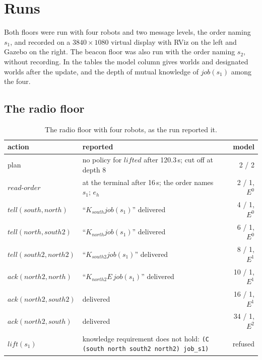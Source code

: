 \documentclass[11pt,a4paper]{article}
\theoremstyle{definition}
\newcommand{\Kop}[1]{K_{#1}}
\newcommand{\code}[1]{\texttt{\small #1}}
\newcommand{\ag}[1]{\mathit{#1}}
\newcommand{\job}{\mathit{job}}
\begin{document}
\section{Runs}
\label{sec:runs}

Both floors were run with four robots and two message levels, the order naming
$s_1$, and recorded on a $3840 \times 1080$ virtual display with RViz on the
left and Gazebo on the right. The beacon floor was also run with the order
naming $s_2$, without recording. In the tables the model column gives worlds
and designated worlds after the update, and the depth of mutual knowledge of
$\job(s_1)$ among the four.

\subsection{The radio floor}

\begin{table}[H]
\centering\small
\caption{The radio floor with four robots, as the run reported it.}
\label{tab:radio-run}
\begin{tabularx}{\textwidth}{@{}l X r@{}}
\toprule
action & reported & model \\
\midrule
plan & no policy for $\mathit{lifted}$ after 120.3\,s; cut off at depth 8 & 2 / 2 \\
$\mathit{read\text{-}order}$ & at the terminal after 16\,s; the order names $s_1$; $e_h$ & 2 / 1, $E^0$ \\
$\mathit{tell}(\ag{south}, \ag{north})$ & ``$\Kop{south}\job(s_1)$'' delivered & 4 / 1, $E^0$ \\
$\mathit{tell}(\ag{north}, \ag{south2})$ & ``$\Kop{north}\job(s_1)$'' delivered & 6 / 1, $E^0$ \\
$\mathit{tell}(\ag{south2}, \ag{north2})$ & ``$\Kop{south2}\job(s_1)$'' delivered & 8 / 1, $E^1$ \\
$\mathit{ack}(\ag{north2}, \ag{north})$ & ``$\Kop{north2}E\,\job(s_1)$'' delivered & 10 / 1, $E^1$ \\
$\mathit{ack}(\ag{north2}, \ag{south2})$ & delivered & 16 / 1, $E^1$ \\
$\mathit{ack}(\ag{north2}, \ag{south})$ & delivered & 34 / 1, $E^2$ \\
$\mathit{lift}(s_1)$ & knowledge requirement does not hold: \code{(C (south north south2 north2) job\_s1)} & refused \\
\bottomrule
\end{tabularx}
\end{table}
\end{document}

